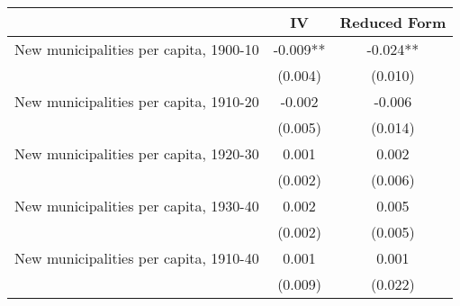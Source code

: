  \begin{tabular}{l*{2}{c}} \toprule
                &\multicolumn{1}{c}{IV}&\multicolumn{1}{c}{Reduced Form}\\
\midrule
New municipalities per capita, 1900-10&   -0.009** &   -0.024** \\
                &  (0.004)   &  (0.010)   \\
\addlinespace
New municipalities per capita, 1910-20&   -0.002   &   -0.006   \\
                &  (0.005)   &  (0.014)   \\
\addlinespace
New municipalities per capita, 1920-30&    0.001   &    0.002   \\
                &  (0.002)   &  (0.006)   \\
\addlinespace
New municipalities per capita, 1930-40&    0.002   &    0.005   \\
                &  (0.002)   &  (0.005)   \\
\addlinespace
New municipalities per capita, 1910-40&    0.001   &    0.001   \\
                &  (0.009)   &  (0.022)   \\
       \bottomrule \end{tabular}
